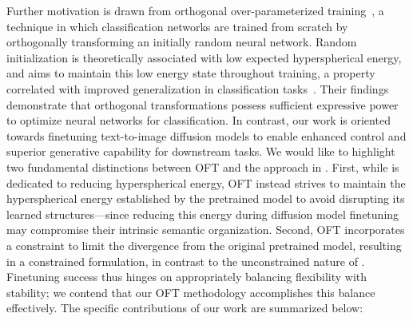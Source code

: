 Further motivation is drawn from orthogonal over-parameterized training~\cite{liu2021orthogonal}, a technique in which classification networks are trained from scratch by orthogonally transforming an initially random neural network. Random initialization is theoretically associated with low expected hyperspherical energy, and \cite{liu2021orthogonal} aims to maintain this low energy state throughout training, a property correlated with improved generalization in classification tasks~\cite{liu2018learning,lin2020regularizing}. Their findings demonstrate that orthogonal transformations possess sufficient expressive power to optimize neural networks for classification. In contrast, our work is oriented towards finetuning text-to-image diffusion models to enable enhanced control and superior generative capability for downstream tasks. We would like to highlight two fundamental distinctions between OFT and the approach in \cite{liu2021orthogonal}. First, while \cite{liu2021orthogonal} is dedicated to reducing hyperspherical energy, OFT instead strives to maintain the hyperspherical energy established by the pretrained model to avoid disrupting its learned structures—since reducing this energy during diffusion model finetuning may compromise their intrinsic semantic organization. Second, OFT incorporates a constraint to limit the divergence from the original pretrained model, resulting in a constrained formulation, in contrast to the unconstrained nature of \cite{liu2021orthogonal}. Finetuning success thus hinges on appropriately balancing flexibility with stability; we contend that our OFT methodology accomplishes this balance effectively. The specific contributions of our work are summarized below:

